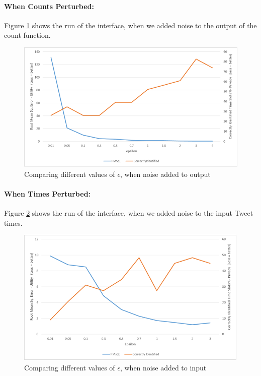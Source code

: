 \documentclass[12pt]{report}
\theoremstyle{named}
\begin{document}
\paragraph{When Counts Perturbed:\\}
Figure \ref{fig:RunWithCounts} shows the run of the interface, when we added noise to the output of the count function.
\begin{figure}[ht]
\centering
        \includegraphics[width=150mm,scale=1]{Images/Counts.png}
    \caption{Comparing different values of $\epsilon$, when noise added to output}
    \label{fig:RunWithCounts}
\end{figure}

\paragraph{When Times Perturbed:\\}
Figure \ref{fig:RunWithTimes} shows the run of the interface, when we added noise to the input Tweet times.
\begin{figure}[ht]
\centering
        \includegraphics[width=150mm,scale=1]{Images/RunWithTimes.png}
    \caption{Comparing different values of $\epsilon$, when noise added to input}
    \label{fig:RunWithTimes}
\end{figure}
\end{document}
